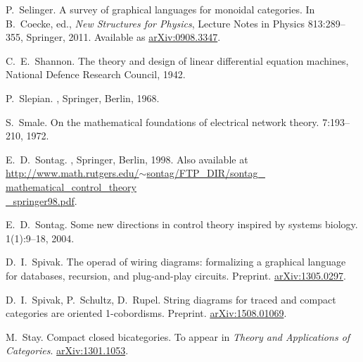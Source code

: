 \begin{thebibliography}{RSW00}
    P.\ Selinger.
    \newblock A survey of graphical languages
    for monoidal categories.
    \newblock In B.\ Coecke, ed., \emph{New Structures for
    Physics}, Lecture Notes in Physics 813:289--355, Springer, 2011.
    \newblock Available
    as \href{http://arxiv.org/abs/0908.3347}{arXiv:0908.3347}.

    C.\ E.\ Shannon.
    \newblock The theory and design of linear differential equation machines, National Defence Research Council, 1942.


    P.\ Slepian.
    , Springer, Berlin, 1968. 

    S.\ Smale.
    \newblock On the mathematical foundations of electrical
    network theory.
     { 7}:193--210, 1972. 

    E.\ D.\ Sontag.
    , Springer, Berlin, 1998. 
    \newblock Also available at \\
    \href{http://www.math.rutgers.edu/~sontag/FTP_DIR/sontag_mathematical_control_theory_springer98.pdf}
    {http://www.math.rutgers.edu/$\sim$sontag/FTP\_DIR/sontag\_ mathematical\_control\_theory\\\_springer98.pdf}.

    E.\ D.\ Sontag. 
    \newblock Some new directions in control theory inspired
    by systems biology.
     { 1}(1):9--18, 2004. 


    D.\ I.\  Spivak.
    \newblock The operad of wiring diagrams:
    formalizing a graphical language for databases, recursion, and plug-and-play
    circuits.
    \newblock Preprint.
    \newblock 
    \href{http://arxiv.org/abs/1305.0297}{arXiv:1305.0297}.

    D.\ I.\ Spivak, P.\ Schultz, D.\ Rupel.
    \newblock String diagrams for traced and compact categories are oriented
    1-cobordisms.
    \newblock Preprint.
    \newblock \href{http://arxiv.org/abs/1508.01069}{arXiv:1508.01069}.

    M.\ Stay.
    \newblock Compact closed bicategories.
    \newblock To appear in {\em Theory and Applications of Categories}.
    \newblock \href{http://arxiv.org/abs/1301.1053}{arXiv:1301.1053}.


\end{thebibliography}

